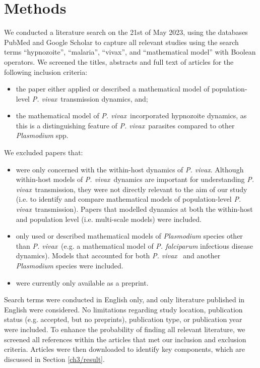\documentclass[12pt]{article}
\newcommand{\pv}{\textit{P. vivax}}
\begin{document}
\section{Methods} \label{method}
We conducted a literature search on the 21st of May 2023, using the databases PubMed and Google Scholar to capture all relevant studies using the search terms ``hypnozoite'', ``malaria'', ``vivax'', and ``mathematical model'' with Boolean operators. We screened the titles, abstracts and full text of articles for the following inclusion criteria: 
\begin{itemize}
    \item the paper either applied or described a mathematical model of population-level \pv~transmission dynamics, and;
    \item the mathematical model of \pv~incorporated hypnozoite dynamics, as this is a distinguishing feature of \pv~parasites compared to other \textit{Plasmodium} spp.
\end{itemize}

We excluded papers that:
\begin{itemize}
    \item were only concerned with the within-host dynamics of \pv. Although within-host models of \pv~dynamics are important for understanding \pv~transmission, they were not directly relevant to the aim of our study (i.e. to identify and compare mathematical models of population-level \pv~transmission). Papers that modelled dynamics at both the within-host and population level (i.e. multi-scale models) were included.
    \item only used or described mathematical models of \textit{Plasmodium} species other than \pv~(e.g. a mathematical model of \textit{P. falciparum} infectious disease dynamics). Models that accounted for both \pv~ and another \textit{Plasmodium} species were included.
    \item were currently only available as a preprint.
     
\end{itemize}

Search terms were conducted in English only, and only literature published in English were considered. No limitations regarding study location, publication status (e.g. accepted, but no preprints), publication type, or publication year were included. To enhance the probability of finding all relevant literature, we screened all references within the articles that met our inclusion and exclusion criteria. Articles were then downloaded to identify key components, which are discussed in Section \ref{ch3/result}.
\end{document}
